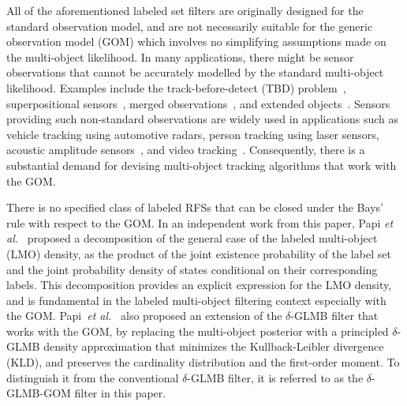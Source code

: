 \documentclass[journal]{IEEEtran}
\begin{document}
All of the aforementioned labeled set filters are originally designed  for the standard observation model, and are not necessarily suitable for the generic observation model (GOM) which involves no simplifying assumptions made on the multi-object likelihood. In many applications, there might be sensor observations that cannot be accurately modelled by the standard multi-object likelihood. Examples include
the   track-before-detect (TBD) problem~\cite{refr:MeMber_filter,refr:tbd-2,refr:tbd-3,refr:tbd-4,refr:tbd-5,haichao1,haichao2}, superpositional sensors~\cite{refr:superpositional-1, refr:superpositional-2, refr:superpositional-3, refr:label_7}, merged observations~\cite{refr:label_4}, and extended objects~\cite{refr:extended-1}. Sensors providing such non-standard observations are widely used in  applications such as 
vehicle tracking using automotive radars, person tracking using laser sensors, acoustic amplitude sensors~\cite{refr:amplitude},  
and video tracking~\cite{refr:computer-vision, refr:vedio-tracking}. Consequently, there is a substantial demand for devising  multi-object tracking algorithms that work with the GOM.

 
There is no specified class of labeled RFSs that can be closed under the Bays' rule with respect to the GOM. In an independent work from this paper, Papi \textit{et al.}~\cite{refr:label_6} proposed  a decomposition of the general case of the  labeled multi-object (LMO) density, as the product of the joint existence probability of the label set and the joint probability density of states conditional on their corresponding labels. This decomposition  provides an explicit expression for the  LMO density, and is  fundamental  in the labeled multi-object filtering context especially with  the GOM.
Papi~\textit{et al.}~\cite{refr:label_6} also proposed an extension of the $\delta$-GLMB filter that  works with the GOM,  by replacing the multi-object posterior with a principled $\delta$-GLMB density approximation that  minimizes the  Kullback-Leibler divergence (KLD), and preserves the cardinality distribution and the first-order moment.
To distinguish it from the conventional $\delta$-GLMB filter, it is referred to as the $\delta$-GLMB-GOM filter in this paper.
\end{document}
